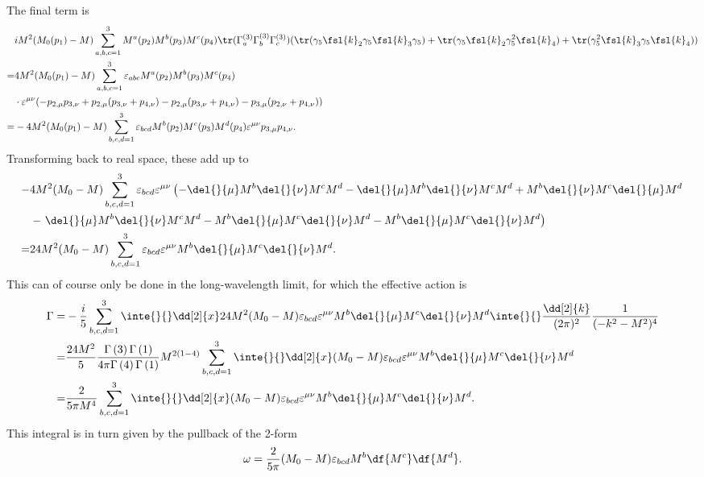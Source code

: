 The final term is
\begin{align*}
	 &iM^{2}(M_{0}(p_{1}) - M)\sum\limits_{a, b, c = 1}^{3}M^{a}(p_{2})M^{b}(p_{3})M^{c}(p_{4})\tr(\Gamma_{a}^{(3)}\Gamma_{b}^{(3)}\Gamma_{c}^{(3)})(\tr(\gamma_{5}\fsl{k}_{2}\gamma_{5}\fsl{k}_{3}\gamma_{5}) + \tr(\gamma_{5}\fsl{k}_{2}\gamma_{5}^{2}\fsl{k}_{4}) + \tr(\gamma_{5}^{2}\fsl{k}_{3}\gamma_{5}\fsl{k}_{4})) \\
	=& 4M^{2}(M_{0}(p_{1}) - M)\sum\limits_{a, b, c = 1}^{3}\varepsilon_{abc}M^{a}(p_{2})M^{b}(p_{3})M^{c}(p_{4}) \\
	 &\cdot\varepsilon^{\mu\nu}(-p_{2, \mu}p_{3, \nu} + p_{2, \mu}(p_{3, \nu} + p_{4, \nu}) - p_{2, \mu}(p_{3, \nu} + p_{4, \nu}) - p_{3, \mu}(p_{2, \nu} + p_{4, \nu})) \\
	=& -4M^{2}(M_{0}(p_{1}) - M)\sum\limits_{b, c, d = 1}^{3}\varepsilon_{bcd}M^{b}(p_{2})M^{c}(p_{3})M^{d}(p_{4})\varepsilon^{\mu\nu}p_{3, \mu}p_{4, \nu}.
\end{align*}
Transforming back to real space, these add up to
\begin{align*}
	-&4M^{2}(M_{0} - M)\sum\limits_{b, c, d = 1}^{3}\varepsilon_{bcd}\varepsilon^{\mu\nu}\left(- \del{}{\mu}M^{b}\del{}{\nu}M^{c}M^{d} - \del{}{\mu}M^{b}\del{}{\nu}M^{c}M^{d} + M^{b}\del{}{\nu}M^{c}\del{}{\mu}M^{d} \right. \\
	&- \left. \del{}{\mu}M^{b}\del{}{\nu}M^{c}M^{d} - M^{b}\del{}{\mu}M^{c}\del{}{\nu}M^{d} - M^{b}\del{}{\mu}M^{c}\del{}{\nu}M^{d}\right) \\
	=& 24M^{2}(M_{0} - M)\sum\limits_{b, c, d = 1}^{3}\varepsilon_{bcd}\varepsilon^{\mu\nu}M^{b}\del{}{\mu}M^{c}\del{}{\nu}M^{d}.
\end{align*}
This can of course only be done in the long-wavelength limit, for which the effective action is
\begin{align*}
	\Gamma =& -\frac{i}{5}\sum\limits_{b, c, d = 1}^{3}\inte{}{}\dd[2]{x}24M^{2}(M_{0} - M)\varepsilon_{bcd}\varepsilon^{\mu\nu}M^{b}\del{}{\mu}M^{c}\del{}{\nu}M^{d}\inte{}{}\frac{\dd[2]{k}}{(2\pi)^{2}}\frac{1}{(-k^{2} - M^{2})^{4}} \\
	       =& \frac{24M^{2}}{5}\frac{\Gamma\left(3\right)\Gamma\left(1\right)}{4\pi\Gamma\left(4\right)\Gamma\left(1\right)}M^{2(1 - 4)}\sum\limits_{b, c, d = 1}^{3}\inte{}{}\dd[2]{x}(M_{0} - M)\varepsilon_{bcd}\varepsilon^{\mu\nu}M^{b}\del{}{\mu}M^{c}\del{}{\nu}M^{d} \\
	       =& \frac{2}{5\pi M^{4}}\sum\limits_{b, c, d = 1}^{3}\inte{}{}\dd[2]{x}(M_{0} - M)\varepsilon_{bcd}\varepsilon^{\mu\nu}M^{b}\del{}{\mu}M^{c}\del{}{\nu}M^{d}.
\end{align*}
This integral is in turn given by the pullback of the 2-form
\begin{align*}
	\omega = \frac{2}{5\pi}(M_{0} - M)\varepsilon_{bcd}M^{b}\df{M^{c}}\df{M^{d}}.
\end{align*}

